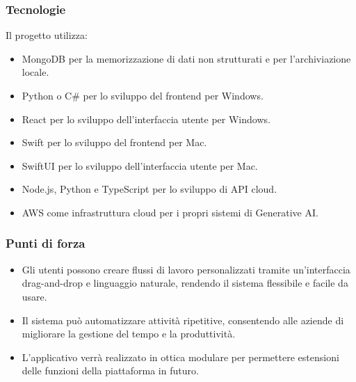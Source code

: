     \subsubsection{Tecnologie}
    Il progetto utilizza:

\begin{itemize}
    \item MongoDB per la memorizzazione di dati non strutturati e per l’archiviazione locale.
    \item Python o C\# per lo sviluppo del frontend per Windows.
    \item React per lo sviluppo dell’interfaccia utente per Windows.
    \item Swift per lo sviluppo del frontend per Mac.
    \item SwiftUI per lo sviluppo dell’interfaccia utente per Mac.
    \item Node.js, Python e TypeScript per lo sviluppo di API cloud.
    \item AWS come infrastruttura cloud per i propri sistemi di Generative AI.
\end{itemize}
    \subsubsection{Punti di forza}
    \begin{itemize}
    \item Gli utenti possono creare flussi di lavoro personalizzati tramite un’interfaccia drag-and-drop e linguaggio naturale, rendendo il sistema flessibile e facile da usare.
    \item Il sistema può automatizzare attività ripetitive, consentendo alle aziende di migliorare la gestione del tempo e la produttività.
    \item L’applicativo verrà realizzato in ottica modulare per permettere estensioni delle funzioni della piattaforma in futuro.
\end{itemize}
